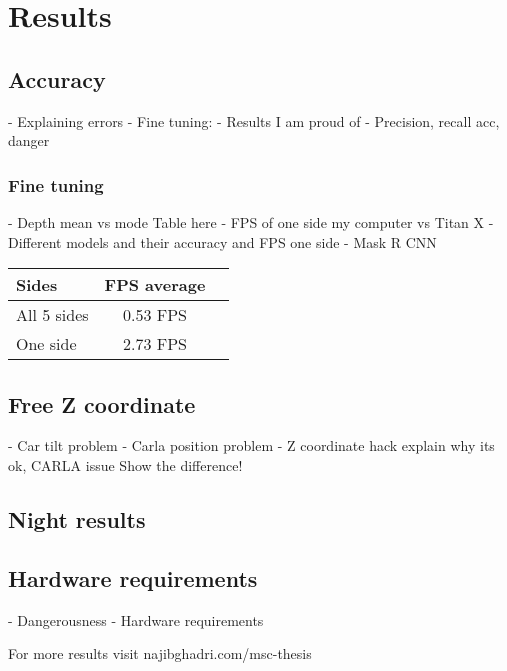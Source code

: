 \chapter{Results}
\label{chap:results}

\section{Accuracy}
- Explaining errors
- Fine tuning:
- Results I am proud of
- Precision, recall acc, danger


\subsection{Fine tuning}
- Depth mean vs mode
Table here
- FPS of one side my computer vs Titan X
- Different models and their accuracy and FPS one side
- Mask R CNN

\begin{table}[ht]
	\footnotesize
	\centering
	\begin{tabular}{ l c c }
		\toprule
		Sides & FPS average \\
		\midrule
		All 5 sides & 0.53 FPS \\
		One side & 2.73 FPS  \\
		\bottomrule
	\end{tabular}
	\label{tab:TabularExample}
\end{table}

\section{Free Z coordinate}
- Car tilt problem
- Carla position problem
- Z coordinate hack explain why its ok, CARLA issue
    Show the difference!

\section{Night results}

\section{Hardware requirements}
- Dangerousness
- Hardware requirements

For more results visit najibghadri.com/msc-thesis